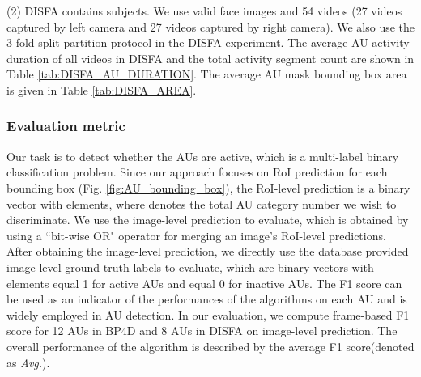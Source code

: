 \documentclass[5p,twocolumn]{elsarticle}
\newcommand{\etal}{\textit{et al}. }
\begin{document}
(2) DISFA \cite{mavadati2013disfa} contains  subjects. We use  valid face images and 54 videos (27 videos captured by left camera and 27 videos captured by right camera).
We also use the 3-fold split partition protocol in the DISFA experiment. The average AU activity duration of all videos in DISFA and the total activity segment count are shown in Table \ref{tab:DISFA_AU_DURATION}. The average AU mask bounding box area is given in Table \ref{tab:DISFA_AREA}.
\begin{comment} Since DISFA dataset is smaller in diversity of AUs than BP4D, we do not directly train AU R-CNN on DISFA. Following Zhao \etal \cite{Zhao2016b} and Li \etal \cite{li2017eac,li2017action}'s cross dataset protocol setting, we train AU R-CNN on mixture datasets of entire BP4D dataset and 2 folds of DISFA, the rest DISFA fold is used for evaluation. The average AU activity duration of all videos in DISFA and the activity segments count are showed in Table \ref{tab:DISFA_AU_DURATION}. \end{comment}



\subsubsection{Evaluation metric}
Our task is to detect whether the AUs
are active, which is a multi-label binary classification problem. Since our approach focuses on RoI prediction for each bounding box (Fig. \ref{fig:AU_bounding_box}), the RoI-level prediction is a binary vector with  elements, where  denotes the total AU category number we wish to discriminate.  We use the image-level prediction to evaluate, which is obtained by using a ``bit-wise OR" operator for merging an image's RoI-level predictions. After obtaining the image-level prediction, we directly use the database provided image-level ground truth labels to evaluate, which are binary vectors with elements equal 1 for active AUs and equal 0 for inactive AUs. 
The F1 score can be used as an indicator of the performances of the algorithms on each AU and is widely employed in AU detection. In our evaluation, we compute frame-based F1 score \cite{ding2013facial} for 12 AUs in BP4D and 8 AUs in DISFA on image-level prediction. The overall performance of the algorithm is described by the average F1 score(denoted as \textit{Avg.}).
\end{document}
